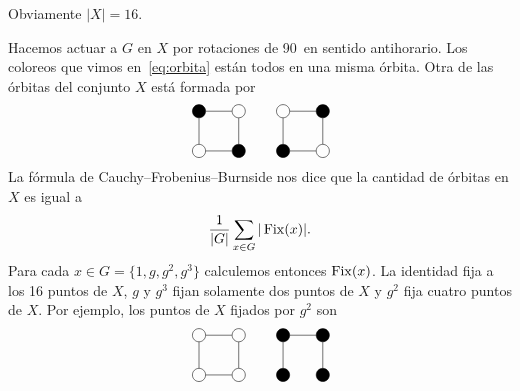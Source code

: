 \begin{example}
Obviamente $|X|=16$. 

Hacemos actuar a $G$ en $X$ por 
rotaciones de 90\textdegree~en sentido antihorario. Los coloreos 
que vimos en~\eqref{eq:orbita} están todos en una misma órbita. 
Otra de las órbitas del conjunto $X$ está formada por
\[
\begin{tikzpicture}
    \node[shape=circle,draw=black,fill=black] (A) at (1,0) {};
    \node[shape=circle,draw=black] (B) at (1,1) {};
    \node[shape=circle,draw=black,fill=black] (C) at (0,1) {};
    \node[shape=circle,draw=black] (D) at (0,0) {};
    \path [-](A) edge node[left]{} (B);
    \path [-](B) edge node[left]{} (C);
    \path [-](C) edge node[left]{} (D);
    \path [-](D) edge node[left]{} (A);
\end{tikzpicture}
\qquad
\begin{tikzpicture}
    \node[shape=circle,draw=black] (A) at (1,0) {};
    \node[shape=circle,draw=black,fill=black] (B) at (1,1) {};
    \node[shape=circle,draw=black] (C) at (0,1) {};
    \node[shape=circle,draw=black,fill=black] (D) at (0,0) {};
    \path [-](A) edge node[left]{} (B);
    \path [-](B) edge node[left]{} (C);
    \path [-](C) edge node[left]{} (D);
    \path [-](D) edge node[left]{} (A);
\end{tikzpicture}
\]
La fórmula de Cauchy--Frobenius--Burnside nos dice que
la cantidad de órbitas en $X$ es igual a 
\[
\frac{1}{|G|}\sum_{x\in G}|\operatorname{Fix}(x)|.
\]
Para cada $x\in G=\{1,g,g^2,g^3\}$ calculemos entonces $\operatorname{Fix}(x)$. La identidad fija a los 16 puntos de $X$, 
$g$ y $g^3$ fijan solamente dos puntos de $X$ y 
$g^2$ fija cuatro puntos de $X$. Por ejemplo,
los puntos de $X$ fijados por $g^2$ son
\[
\begin{tikzpicture}
    \node[shape=circle,draw=black] (A) at (1,0){};
    \node[shape=circle,draw=black] (B) at (1,1){};
    \node[shape=circle,draw=black] (C) at (0,1){}; 
    \node[shape=circle,draw=black] (D) at (0,0){};
    \path [-](A) edge node[left]{} (B);
    \path [-](B) edge node[left]{} (C);
    \path [-](C) edge node[left]{} (D);
    \path [-](D) edge node[left]{} (A);
\end{tikzpicture}
\qquad
\begin{tikzpicture}
    \node[shape=circle,draw=black,fill=black] (A) at (1,0) {};
    \node[shape=circle,draw=black,fill=black] (B) at (1,1) {};
    \node[shape=circle,draw=black,fill=black] (C) at (0,1) {};
    \node[shape=circle,draw=black,fill=black] (D) at (0,0) {};
    \path [-](A) edge node[left]{} (B);
    \path [-](B) edge node[left]{} (C);
    \path [-](C) edge node[left]{} (D);

\end{tikzpicture}\]
\end{example}
